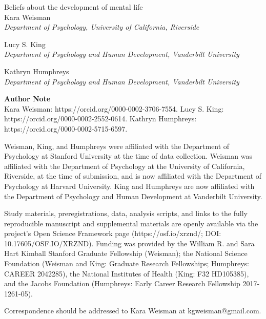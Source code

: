 \begin{titlepage}
    \begin{center}
        \vspace*{1in}
        {\Large Beliefs about the development of mental life} \\[2cm]
        
        Kara Weisman\\
        \textit{Department of Psychology, University of California, Riverside}\par
        \vspace{0.5cm}
        Lucy S. King\\
        \textit{Department of Psychology and Human Development, Vanderbilt University}\par
        \vspace{0.5cm}
        Kathryn Humphreys\\
        \textit{Department of Psychology and Human Development, Vanderbilt University}\par
    
    \end{center}
    \vfill
    \textbf{Author Note} \\
    \setlength{\parindent}{2em}
    \indent Kara Weisman: https://orcid.org/0000-0002-3706-7554. Lucy S. King: https://orcid.org/0000-0002-2552-0614. Kathryn Humphreys: https://orcid.org/0000-0002-5715-6597.

    \indent Weisman, King, and Humphreys were affiliated with the Department of Psychology at Stanford University at the time of data collection. Weisman was affiliated with the Department of Psychology at the University of California, Riverside, at the time of submission, and is now affiliated with the Department of Psychology at Harvard University. King and Humphreys are now affiliated with the Department of Psychology and Human Development at Vanderbilt University. 

    \indent Study materials, preregistrations, data, analysis scripts, and links to the fully reproducible manuscript and supplemental materials are openly available via the project’s Open Science Framework page (https://osf.io/xrznd/; DOI: 10.17605/OSF.IO/XRZND). Funding was provided by the William R. and Sara Hart Kimball Stanford Graduate Fellowship (Weisman); the National Science Foundation (Weisman and King: Graduate Research Fellowships; Humphreys: CAREER 2042285), the National Institutes of Health (King: F32 HD105385), and the Jacobs Foundation (Humphreys: Early Career Research Fellowship 2017-1261-05).

    \indent Correspondence should be addressed to Kara Weisman at kgweisman@gmail.com.
\end{titlepage}
